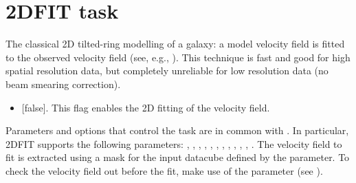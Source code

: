 \documentclass[letterpaper,10pt,english]{sphinxmanual}
\begin{document}
\section{2DFIT task}
\label{\detokenize{tasks:id3}}
The classical 2D tilted-ring modelling of a galaxy: a model velocity field is fitted to the observed velocity field (see, e.g., ). This technique is fast and good for high spatial resolution data, but completely unreliable for low resolution data (no beam smearing correction).
\begin{itemize}
\item {} 
 {[}false{]}. This flag enables the 2D fitting of the velocity field.

\end{itemize}

Parameters and options that control the task are in common with {\hyperref[\detokenize{tasks:dfitopt}]{}}. In particular, 2DFIT supports the following parameters: , , , , , , , , , , , . The velocity field to fit is extracted using a mask for the input datacube defined by the  parameter. To check the velocity field out before the fit, make use of the  parameter (see {\hyperref[\detokenize{tasks:momentstask}]{}}).
\end{document}
